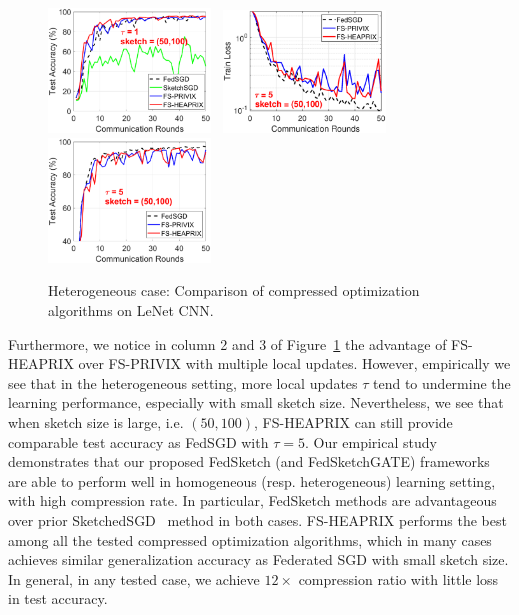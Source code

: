 \documentclass[twoside]{article}
\begin{document}
\begin{figure}[t]
\begin{center}
{		\includegraphics[width=1.7in]{MNIST_figures/local1_sketch50_iid0_test_acc.eps} \hspace{-0.2in}
		}
		\mbox{
		\includegraphics[width=1.7in]{MNIST_figures/local5_sketch50_iid0_train_loss.eps}\hspace{-0.2in}
		\includegraphics[width=1.7in]{MNIST_figures/local5_sketch50_iid0_test_acc.eps}\hspace{-0.2in}
		}
	\end{center}
	\caption{Heterogeneous case: Comparison of compressed optimization algorithms on LeNet CNN.}
    \label{fig:MNIST-iid0}
\end{figure}
Furthermore, we notice in column 2 and 3 of Figure~\ref{fig:MNIST-iid0} the advantage of FS-HEAPRIX over FS-PRIVIX with multiple local updates. However, empirically we see that in the heterogeneous setting, more local updates $\tau$ tend to undermine the learning performance, especially with small sketch size.  Nevertheless, we see that when sketch size is large, i.e. $(50,100)$, FS-HEAPRIX can still provide comparable test accuracy as FedSGD with $\tau=5$.
Our empirical study demonstrates that our proposed FedSketch (and FedSketchGATE) frameworks are able to perform well in homogeneous (resp. heterogeneous) learning setting, with high compression rate. In particular, FedSketch methods are advantageous over prior SketchedSGD~\cite{ivkin2019communication} method in both cases. FS-HEAPRIX performs the best among all the tested compressed optimization algorithms, which in many cases achieves similar generalization accuracy as Federated SGD with small sketch size. 
In general, in any tested case, we achieve $12\times$ compression ratio with little loss in test accuracy.
\end{document}
